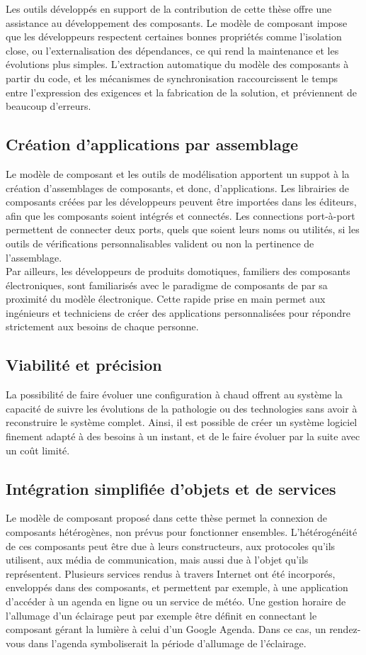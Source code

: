 Les outils développés en support de la contribution de cette thèse offre une assistance au développement des composants. Le modèle de composant impose que les développeurs respectent certaines bonnes propriétés comme l'isolation close, ou l'externalisation des dépendances, ce qui rend la maintenance et les évolutions plus simples. L'extraction automatique du modèle des composants à partir du code, et les mécanismes de synchronisation raccourcissent le temps entre l'expression des exigences et la fabrication de la solution, et préviennent de beaucoup d'erreurs.


\subsection{Création d'applications par assemblage}
Le modèle de composant et les outils de modélisation apportent un suppot à la création d'assemblages de composants, et donc, d'applications. Les librairies de composants créées par les développeurs peuvent être importées dans les éditeurs, afin que les composants soient intégrés et connectés. Les connections port-à-port permettent de connecter deux ports, quels que soient leurs noms ou utilités, si les outils de vérifications personnalisables valident ou non la pertinence de l'assemblage.\\
Par ailleurs, les développeurs de produits domotiques, familiers des composants électroniques, sont familiarisés avec le paradigme de composants de par sa proximité du modèle électronique. Cette rapide prise en main permet aux ingénieurs et techniciens de créer des applications personnalisées pour répondre strictement aux besoins de chaque personne.

\subsection{Viabilité et précision}
La possibilité de faire évoluer une configuration à chaud offrent au système la capacité de suivre les évolutions de la pathologie ou des technologies sans avoir à reconstruire le système complet. Ainsi, il est possible de créer un système logiciel finement adapté à des besoins à un instant, et de le faire évoluer par la suite avec un coût limité.

\subsection{Intégration simplifiée d'objets et de services}
Le modèle de composant proposé dans cette thèse permet la connexion de composants hétérogènes, non prévus pour fonctionner ensembles. L'hétérogénéité de ces composants peut être due à leurs constructeurs, aux protocoles qu'ils utilisent, aux média de communication, mais aussi due à l'objet qu'ils représentent. Plusieurs services rendus à travers Internet ont été incorporés, enveloppés dans des composants, et permettent par exemple, à une application d'accéder à un agenda en ligne ou un service de météo. Une gestion horaire de l'allumage d'un éclairage peut par exemple \^etre définit en connectant le composant gérant la lumière à celui d'un Google Agenda. Dans ce cas, un rendez-vous dans l'agenda symboliserait la période d'allumage de l'éclairage.


